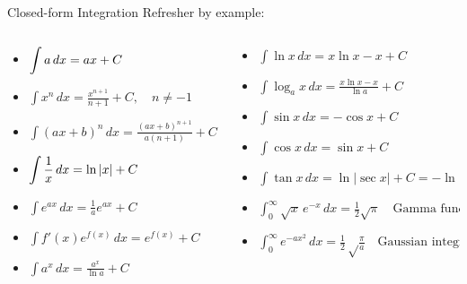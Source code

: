 \begin{frame}{Closed-form Integration}
    Refresher by example:
    \begin{columns}[onlytextwidth]
        \begin{column}{0.5\textwidth}
            \begin{itemize}
                \item $\displaystyle{ \int a \mathop{dx} = a x + C}$
                \item $\displaystyle{ \int x^n\,dx = \frac{x^{n+1}}{n+1} + C, \quad n\neq -1 }$
                \item $\displaystyle{ \int (ax + b)^n \, dx= \frac{(ax + b)^{n+1}}{a(n + 1)} + C, \quad n\neq -1}$
                \item $\displaystyle{ \int {1 \over x}\,dx = \ln \left|x \right| + C }$
                \item $\displaystyle{ \int e^{ax}\,dx = \frac{1}{a}e^{ax} + C }$
                \item $\displaystyle{ \int f'(x)e^{f(x)}\,dx = e^{f(x)} + C }$
                \item $\displaystyle{ \int a^x\,dx = \frac{a^x}{\ln a} + C }$
            \end{itemize}
        \end{column}
        \begin{column}{0.5\textwidth}
            \begin{itemize}
                \item $\displaystyle{ \int \ln x\,dx = x \ln x - x + C }$
                \item $\displaystyle{ \int \log_a x\,dx = \frac{x\ln x - x}{\ln a} + C }$
                \item $\displaystyle{ \int \sin{x}\, dx = -\cos{x} + C }$
                \item $\displaystyle{ \int \cos{x}\, dx = \sin{x} + C }$
                \item $\displaystyle{ \int \tan{x} \, dx = \ln{\left| \sec{x} \right|} + C = -\ln{\left| \cos {x} \right|} + C }$
                \item $\displaystyle{ \int_0^\infty \sqrt{x}\,e^{-x}\,dx = \frac{1}{2}\sqrt \pi } \quad \text{Gamma function}$
                \item $\displaystyle{ \int_0^\infty e^{-a x^2}\,dx = \frac{1}{2} \sqrt \frac {\pi} {a} \quad \text{Gaussian integral}, a>0}$
            \end{itemize}
        \end{column}
    \end{columns}
\end{frame}

